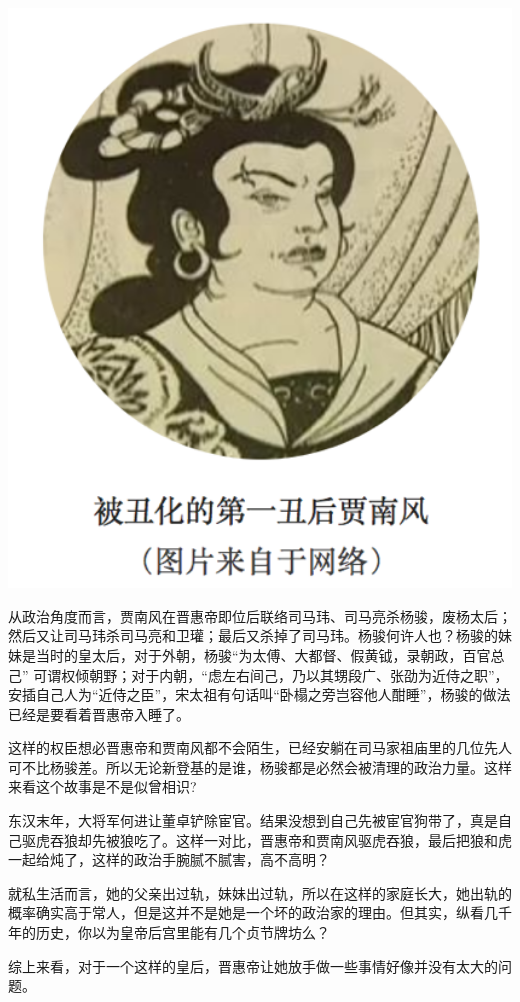 \documentclass[
]{book}
\begin{document}
\includegraphics[width=5.79in]{images/his7}

从政治角度而言，贾南风在晋惠帝即位后联络司马玮、司马亮杀杨骏，废杨太后；然后又让司马玮杀司马亮和卫瓘；最后又杀掉了司马玮。杨骏何许人也？杨骏的妹妹是当时的皇太后，对于外朝，杨骏``为太傅、大都督、假黄钺，录朝政，百官总己'' 可谓权倾朝野；对于内朝，``虑左右间己，乃以其甥段广、张劭为近侍之职''，安插自己人为``近侍之臣''，宋太祖有句话叫``卧榻之旁岂容他人酣睡''，杨骏的做法已经是要看着晋惠帝入睡了。

这样的权臣想必晋惠帝和贾南风都不会陌生，已经安躺在司马家祖庙里的几位先人可不比杨骏差。所以无论新登基的是谁，杨骏都是必然会被清理的政治力量。这样来看这个故事是不是似曾相识?

东汉末年，大将军何进让董卓铲除宦官。结果没想到自己先被宦官狗带了，真是自己驱虎吞狼却先被狼吃了。这样一对比，晋惠帝和贾南风驱虎吞狼，最后把狼和虎一起给炖了，这样的政治手腕腻不腻害，高不高明？

就私生活而言，她的父亲出过轨，妹妹出过轨，所以在这样的家庭长大，她出轨的概率确实高于常人，但是这并不是她是一个坏的政治家的理由。但其实，纵看几千年的历史，你以为皇帝后宫里能有几个贞节牌坊么？

综上来看，对于一个这样的皇后，晋惠帝让她放手做一些事情好像并没有太大的问题。
\end{document}
